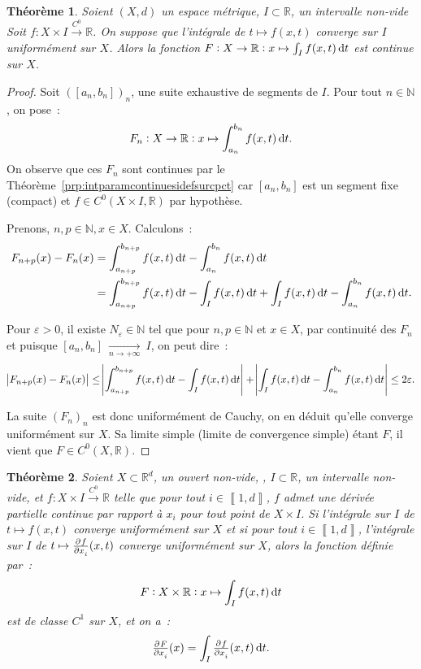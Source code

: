 \documentclass{report}
\newtheorem{thm}{Théorème}[chapter]
\theoremstyle{definition}
\theoremstyle{remark}
\numberwithin{equation}{section}
\newcommand{\R}{\mathbb R}
\newcommand{\N}{\mathbb N}
\newcommand{\intint}[2]{\left\llbracket#1, #2\right\rrbracket}
\newcommand{\toC}[1]{\xrightarrow{C^{#1}}}
\newcommand{\tocont}{\toC 0}
\newcommand{\pinfty}{{+\infty}}
\begin{document}
			\begin{thm}\label{thm:intparamcontinuesiconvunif} Soient $(X, d)$ un espace métrique, $I \subset \R$, un intervalle non-vide Soit
			$f : X \times I \tocont \R$. On suppose que l'intégrale de $t \mapsto f(x, t)$ converge sur $I$ uniformément sur $X$. Alors la fonction
			$F : X \to \R : x \mapsto \int_I f(x, t)\dif t$ est continue sur $X$.
			\end{thm}

			\begin{proof} Soit $([a_n, b_n])_n$, une suite exhaustive de segments de $I$. Pour tout $n \in \N$, on pose~:
			\begin{equation}
				F_n : X \to \R : x \mapsto \int_{a_n}^{b_n}f(x, t)\dif t.
			\end{equation}
			On observe que ces $F_n$ sont continues par le Théorème~\ref{prp:intparamcontinuesidefsurcpct} car $[a_n, b_n]$ est un segment fixe (compact)
			et $f \in C^0(X \times I, \R)$ par hypothèse.

			Prenons, $n, p \in \N, x \in X$. Calculons~:
			\begin{align}
				F_{n+p}(x) - F_n(x) &= \int_{a_{n+p}}^{b_{n+p}}f(x, t)\dif t - \int_{a_n}^{b_n}f(x, t)\dif t \\
				&= \int_{a_{n+p}}^{b_{n+p}}f(x, t)\dif t - \int_If(x, t)\dif t + \int_If(x, t)\dif t - \int_{a_n}^{b_n}f(x, t)\dif t.
			\end{align}

			Pour $\varepsilon > 0$, il existe $N_\varepsilon \in \N$ tel que pour $n, p \in \N$ et $x \in X$, par continuité des $F_n$ et puisque
			$[a_n, b_n]~\xrightarrow[n \to \pinfty]{}~I$, on peut dire~:
			\begin{equation}
				\abs {F_{n+p}(x) - F_n(x)}
				\leq \abs {\int_{a_{n+p}}^{b_{n+p}}f(x, t)\dif t - \int_If(x, t)\dif t} + \abs {\int_If(x, t)\dif t - \int_{a_n}^{b_n}f(x, t)\dif t}
				\leq 2\varepsilon.
			\end{equation}

			La suite $(F_n)_n$ est donc uniformément de Cauchy, on en déduit qu'elle converge uniformément sur $X$. Sa limite simple (limite de convergence
			simple) étant $F$, il vient que $F \in C^0(X, \R)$.
			\end{proof}

			\begin{thm} Soient $X \subset \R^d$, un ouvert non-vide, , $I \subset \R$, un intervalle non-vide, et $f : X \times I \tocont \R$ telle que pour
			tout $i \in \intint 1d$, $f$ admet une dérivée partielle continue par rapport à $x_i$ pour tout point de $X \times I$. Si l'intégrale sur $I$ de
			$t \mapsto f(x, t)$ converge uniformément sur $X$ et si pour tout $i \in \intint 1d$, l'intégrale sur $I$ de $t \mapsto \pd f{x_i}(x, t)$ converge
			uniformément sur $X$, alors la fonction définie par~:
			\begin{equation}
				F : X \times \R : x \mapsto \int_If(x, t)\dif t
			\end{equation}
			est de classe $C^1$ sur $X$, et on a~:
			\begin{equation}
				\pd F{x_i}(x) = \int_I\pd f{x_i}(x, t)\dif t.
			\end{equation}
			\end{thm}
\end{document}

